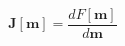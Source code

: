 \begin{equation}
    \mathbf{J}[\mathbf{m}] = \frac{d F[\mathbf{m}]}{d \mathbf{m}}
\label{eq:sensitivity}
\end{equation}
